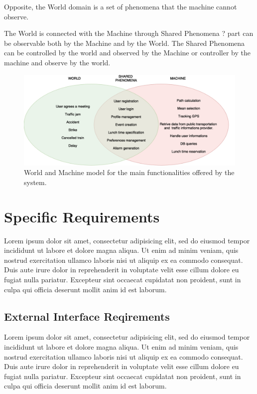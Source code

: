 \documentclass{report}
\begin{document}
	\bigskip
	Opposite, the World domain is a set of phenomena that the machine cannot observe.

	\bigskip
	The World is connected with the Machine through Shared Phenomena ? part can be observable both by the Machine and by the World. The Shared Phenomena can be controlled by the world and observed by the Machine or controller by the machine and observe by the world.
	
	\bigskip
	\bigskip
	\begin{figure}[htbp]
		\begin{center}
		\includegraphics[width=\textwidth]{img/WorldAndMachineModel.png}
		\caption{World and Machine model for the main functionalities offered by the system.}
		\label{default}
		\end{center}
	\end{figure}

	
	\chapter{Specific Requirements}
	Lorem ipsum dolor sit amet, consectetur adipisicing elit, sed do eiusmod
	tempor incididunt ut labore et dolore magna aliqua. Ut enim ad minim veniam,
	quis nostrud exercitation ullamco laboris nisi ut aliquip ex ea commodo
	consequat. Duis aute irure dolor in reprehenderit in voluptate velit esse
	cillum dolore eu fugiat nulla pariatur. Excepteur sint occaecat cupidatat non
	proident, sunt in culpa qui officia deserunt mollit anim id est laborum.
	
	
	\section{External Interface Reqirements}
	Lorem ipsum dolor sit amet, consectetur adipisicing elit, sed do eiusmod
	tempor incididunt ut labore et dolore magna aliqua. Ut enim ad minim veniam,
	quis nostrud exercitation ullamco laboris nisi ut aliquip ex ea commodo
	consequat. Duis aute irure dolor in reprehenderit in voluptate velit esse
	cillum dolore eu fugiat nulla pariatur. Excepteur sint occaecat cupidatat non
	proident, sunt in culpa qui officia deserunt mollit anim id est laborum.
	
\end{document}
